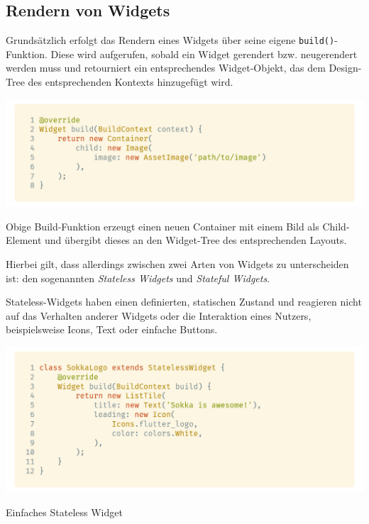 
\subsection{Rendern von Widgets}

Grundsätzlich erfolgt das Rendern eines Widgets über seine eigene \lstinline{build()}-Funktion. Diese wird aufgerufen,
sobald ein Widget gerendert bzw. neugerendert werden muss und retourniert ein entsprechendes Widget-Objekt,
das dem Design-Tree des entsprechenden Kontexts hinzugefügt wird.

\begin{code}
    \centering
    \includegraphics[width=1\textwidth]{images/Flutter/flutterBuildFunction.png}
    \vspace{-25pt}
    \caption{\lstinline{build()}-Funktion eines Widgets}
\end{code}

Obige Build-Funktion erzeugt einen neuen Container mit einem Bild als Child-Element und übergibt dieses
an den Widget-Tree des entsprechenden Layouts.

Hierbei gilt, dass allerdings zwischen zwei Arten von Widgets zu unterscheiden ist: den sogenannten \textit{Stateless Widgets}
und \textit{Stateful Widgets}.

Stateless-Widgets haben einen definierten, statischen Zustand und reagieren nicht
auf das Verhalten anderer Widgets oder die Interaktion eines Nutzers, beispielsweise Icons, Text oder einfache
Buttons.

\begin{code}
    \centering
    \includegraphics[width=1\textwidth]{images/Flutter/flutterStatelessWidget.png}
    \vspace{-25pt}
    \caption{Einfaches Stateless Widget}
\end{code}

